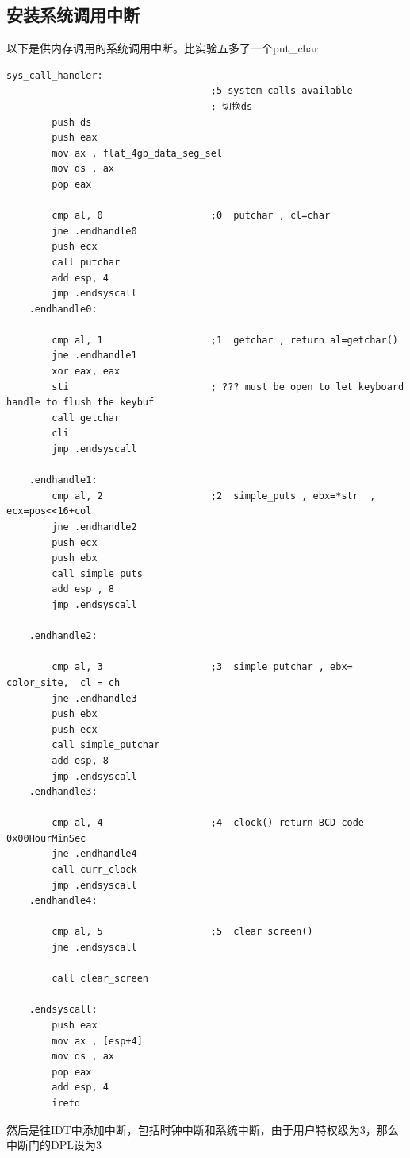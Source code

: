 \documentclass[a4paper,11pt,UTF8]{ctexart}
\begin{document}
	\subsection{安装系统调用中断}
	以下是供内存调用的系统调用中断。比实验五多了一个put\_char
	\begin{lstlisting}[language=={[x86masm]Assembler}keywordstyle=\color{blue!70},commentstyle=\color{red!50!green!50!blue!50},frame=shadowbox, rulesepcolor=\color{red!20!green!20!blue!20}]
sys_call_handler: 
									;5 system calls available
									; 切换ds
		push ds
		push eax
		mov ax , flat_4gb_data_seg_sel
		mov ds , ax
		pop eax

		cmp al, 0					;0  putchar , cl=char
		jne	.endhandle0
		push ecx
		call putchar
		add esp, 4
		jmp .endsyscall
	.endhandle0:

		cmp al, 1					;1	getchar , return al=getchar()
		jne	.endhandle1
		xor eax, eax
		sti							; ??? must be open to let keyboard handle to flush the keybuf
		call getchar
		cli
		jmp .endsyscall
		
	.endhandle1:
		cmp al, 2					;2	simple_puts , ebx=*str  , ecx=pos<<16+col
		jne	.endhandle2
		push ecx
		push ebx
		call simple_puts
		add esp , 8
		jmp .endsyscall
		
	.endhandle2:

		cmp al, 3					;3  simple_putchar , ebx= color_site,  cl = ch
		jne	.endhandle3
		push ebx
		push ecx
		call simple_putchar
		add esp, 8
		jmp .endsyscall
	.endhandle3:

		cmp al, 4					;4  clock() return BCD code 0x00HourMinSec
		jne	.endhandle4
		call curr_clock
		jmp .endsyscall
	.endhandle4:

		cmp al, 5					;5	clear screen()
		jne	.endsyscall

		call clear_screen

	.endsyscall:
		push eax
		mov ax , [esp+4]
		mov ds , ax
		pop eax
		add esp, 4
		iretd

	\end{lstlisting}
	然后是往IDT中添加中断，包括时钟中断和系统中断，由于用户特权级为3，那么中断门的DPL设为3
\end{document}
